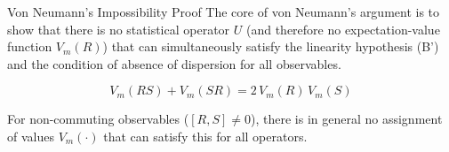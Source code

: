 \begin{frame}{Von Neumann's Impossibility Proof}
  The core of von Neumann's argument is to show that there is no statistical operator $U$
  (and therefore no expectation-value function $V_m(R)$) that can simultaneously satisfy
  the linearity hypothesis (B') and the condition of absence of dispersion for all observables.

  \vspace{0.5cm}

  \[
    V_m(RS) + V_m(SR) = 2\,V_m(R)\,V_m(S)
  \]

  \vspace{0.5cm}

  For non-commuting observables ($[R,S]\neq 0$), there is in general no assignment
  of values $V_m(\cdot)$ that can satisfy this for all operators.
\end{frame}



